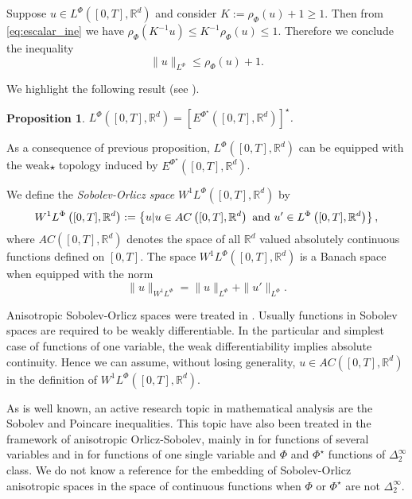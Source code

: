 \documentclass[twoside]{article}
\newtheorem{prop}[thm]{Proposition}
\theoremstyle{remark}
\newcommand{\orlnor}{\|_{L^{\Phi}}}
\newcommand{\lphi}{L^{\Phi}}
\newcommand{\wphi}{W^{1}\lphi}
\newcommand{\rr}{\mathbb{R}}
\renewcommand{\leq}{\leqslant}
\renewcommand{\geq}{\geqslant}
\newcommand{\epsi}{E^{\Phi^{\star}}}
\begin{document}
Suppose $u\in\lphi([0,T],\rr^d)$ and consider $K:=\rho_{\Phi}(u)+1\geq 1$. Then from \eqref{eq:escalar_ine} we have $\rho_{\Phi}(K^{-1}u)\leq K^{-1}\rho_{\Phi}(u)\leq 1$. Therefore we conclude the inequality
\begin{equation}\label{eq:amemiya}
 \|u\orlnor \leq \rho_{\Phi}(u)+1.
\end{equation}



We highlight the following result (see \cite[Th. 3.3]{gwiazda2013anisotropic}).

\begin{prop} $\lphi\left([0,T],\rr^d\right)=\left[\epsi\left([0,T],\rr^d\right)\right]^{\star}$.
 
\end{prop}


As a consequence of previous proposition,  $\lphi\left([0,T],\rr^d\right)$ can be equipped with the weak$\star$ topology induced by $\epsi\left([0,T],\rr^d\right)$.



We define the \emph{Sobolev-Orlicz space} $\wphi\left([0,T],\rr^d\right)$ by
\[\wphi\left([0,T],\rr^d\right):=\left\{u| u\in AC\left([0,T],\rr^d\right) \hbox{ and } u'\in \lphi\left([0,T],\rr^d\right)\right\},\]
where $AC\left([0,T],\rr^d\right)$ denotes the space of all $\rr^d$ valued absolutely continuous functions defined on $[0,T]$. The space $\wphi\left([0,T],\rr^d\right)$ is a Banach space when equipped with the norm
\begin{equation}\label{def-norma-orlicz-sob}
\|  u  \|_{\wphi}= \|  u  \|_{\lphi} + \|u'\orlnor.
\end{equation}

Anisotropic Sobolev-Orlicz spaces were treated in \cite{chamra2017anisotropic,cianchi2000fully,cianchi2004optimal,trudinger1974imbedding}. Usually functions in Sobolev spaces are required to be weakly differentiable. In the particular and simplest case of functions of one variable, the weak differentiability implies absolute continuity. Hence we can assume, without losing generality, $u\in AC\left([0,T],\rr^d\right)$ in the definition of $\wphi\left([0,T],\rr^d\right)$.



As is well known, an active research topic in mathematical analysis are the Sobolev and Poincare inequalities. This topic have also been treated in the framework of anisotropic Orlicz-Sobolev, mainly in \cite{cianchi2000fully,cianchi2004optimal,trudinger1974imbedding} for functions of several variables  and in \cite{chamra2017anisotropic} for functions of one single variable and $\Phi$ and $\Phi^{\star}$ functions of $\Delta_2^{\infty}$ class.   We do not know a reference for the embedding of Sobolev-Orlicz anisotropic spaces in the space of continuous functions when $\Phi$ or $\Phi^{\star}$ are not $\Delta_2^{\infty}$.
\end{document}
